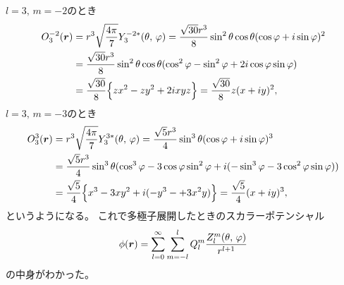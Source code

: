 \documentclass[../../master.tex]{subfiles}
\begin{document}
\(l=3,\,m=-2\)のとき
\begin{equation}\begin{aligned}[b]
    O_3^{-2}(\vb*{r})
    &= r^3 \sqrt{\frac{4\pi}{7}} Y_3^{-2*}(\theta,\,\varphi)
    = \frac{\sqrt{30}r^3}{8} \sin^2\theta \cos\theta (\cos\varphi+i\sin\varphi)^2\\
    &= \frac{\sqrt{30}r^3}{8} \sin^2\theta \cos\theta (\cos^2\varphi - \sin^2\varphi + 2i\cos\varphi\sin\varphi)\\
    &= \frac{\sqrt{30}}{8} \Big\{zx^2-zy^2 + 2ixyz\Big\}
    = \frac{\sqrt{30}}{8} z(x+iy)^2,
\end{aligned}\end{equation}
\(l=3,\,m=-3\)のとき
\begin{equation}\begin{aligned}[b]
    O_3^3(\vb*{r})
    &= r^3 \sqrt{\frac{4\pi}{7}} Y_3^{3*}(\theta,\,\varphi)
    = \frac{\sqrt{5}r^3}{4} \sin^3\theta (\cos\varphi+i\sin\varphi)^3\\
    &= \frac{\sqrt{5}r^3}{4} \sin^3\theta (\cos^3\varphi - 3\cos\varphi\sin^2\varphi + i(-\sin^3\varphi - 3\cos^2\varphi\sin\varphi))\\
    &= \frac{\sqrt{5}}{4} \Big\{x^3-3xy^2+i(-y^3-+3x^2y)\Big\}
    = \frac{\sqrt{5}}{4} (x+iy)^3,
\end{aligned}\end{equation}
というようになる。
これで多極子展開したときのスカラーポテンシャル
\begin{equation}
    \phi(\vb*{r}) = \sum_{l=0}^{\infty} \sum_{m=-l}^{l} Q_l^m\frac{Z_l^m(\theta,\,\varphi)}{r^{l+1}}
\end{equation}
の中身がわかった。
\end{document}

